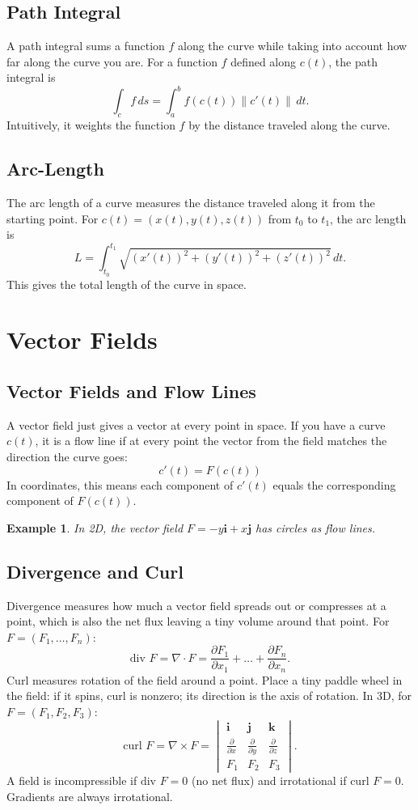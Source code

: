 \documentclass{article}
\newtheorem*{example}{Example}
\begin{document}
\subsection{Path Integral}  
A path integral sums a function \(f\) along the curve while taking into account how far along the curve you are. For a function \(f\) defined along \(c(t)\), the path integral is
\[\int_c f \, ds = \int_a^b f(c(t)) \|c'(t)\| \, dt.\]  
Intuitively, it weights the function \(f\) by the distance traveled along the curve.

\subsection{Arc-Length}  
The arc length of a curve measures the distance traveled along it from the starting point. For \(c(t) = (x(t), y(t), z(t))\) from \(t_0\) to \(t_1\), the arc length is
\[L = \int_{t_0}^{t_1} \sqrt{(x'(t))^2 + (y'(t))^2 + (z'(t))^2} \, dt.\]  
This gives the total length of the curve in space.

\section{Vector Fields}
\subsection{Vector Fields and Flow Lines}  
A vector field just gives a vector at every point in space. If you have a curve \(c(t)\), it is a flow line if at every point the vector from the field matches the direction the curve goes:  
\[c'(t) = F(c(t))\]  
In coordinates, this means each component of \(c'(t)\) equals the corresponding component of \(F(c(t))\).  

\begin{example}
    In 2D, the vector field \(F = -y\mathbf{i} + x\mathbf{j}\) has circles as flow lines.
\end{example}

\subsection{Divergence and Curl}  
Divergence measures how much a vector field spreads out or compresses at a point, which is also the net flux leaving a tiny volume around that point. For \(F = (F_1, \dots, F_n)\):  
\[\text{div } F = \nabla \cdot F = \frac{\partial F_1}{\partial x_1} + \dots + \frac{\partial F_n}{\partial x_n}.\]  
Curl measures rotation of the field around a point. Place a tiny paddle wheel in the field: if it spins, curl is nonzero; its direction is the axis of rotation. In 3D, for \(F = (F_1, F_2, F_3)\):  
\[\text{curl } F = \nabla \times F = \begin{vmatrix}\mathbf{i} & \mathbf{j} & \mathbf{k} \\\frac{\partial}{\partial x} & \frac{\partial}{\partial y} & \frac{\partial}{\partial z} \\F_1 & F_2 & F_3\end{vmatrix}.\]  
A field is incompressible if \(\text{div } F = 0\) (no net flux) and irrotational if \(\text{curl } F = 0\). Gradients are always irrotational.
\end{document}
